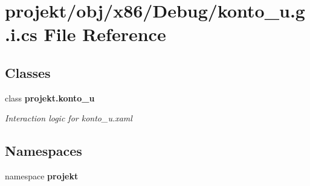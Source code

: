 \section{projekt/obj/x86/\+Debug/konto\+\_\+u.g.\+i.\+cs File Reference}
\label{x86_2Debug_2konto__u_8g_8i_8cs}
\subsection*{Classes}
\begin{DoxyCompactItemize}
\item 
class \textbf{ projekt.\+konto\+\_\+u}
\begin{DoxyCompactList}\small\item\em Interaction logic for konto\+\_\+u.\+xaml \end{DoxyCompactList}\end{DoxyCompactItemize}
\subsection*{Namespaces}
\begin{DoxyCompactItemize}
\item 
namespace \textbf{ projekt}
\end{DoxyCompactItemize}
